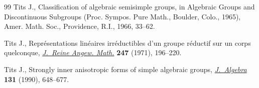 \documentclass[10pt,a4paper]{amsart}
\numberwithin{equation}{section}
\begin{document}
\begin{thebibliography}{99}
Tits J., Classif\/ication of algebraic semisimple groups, in Algebraic {G}roups
  and {D}iscontinuous {S}ubgroups ({P}roc. {S}ympos. {P}ure {M}ath., {B}oulder,
  {C}olo., 1965), Amer. Math. Soc., Providence, R.I., 1966, 33--62.

Tits J., Repr\'esentations lin\'eaires irr\'eductibles d'un groupe r\'eductif
  sur un corps quelconque, \href{http://dx.doi.org/10.1515/crll.1971.247.196}{\textit{J.~Reine Angew. Math.}} \textbf{247} (1971),
  196--220.

Tits J., Strongly inner anisotropic forms of simple algebraic groups,
  \href{http://dx.doi.org/10.1016/0021-8693(90)90201-X}{\textit{J.~Algebra}} \textbf{131} (1990), 648--677.

\end{thebibliography}
\end{document}
